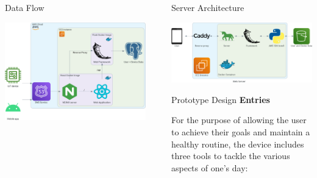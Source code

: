 \documentclass[final]{beamer}
\newlength{\sepwidth}
\newlength{\colwidth}
\newcommand{\separatorcolumn}{\begin{column}{\sepwidth}\end{column}}
\begin{document}
\begin{frame}[t]
\begin{columns}[t]
\begin{column}{\colwidth}
  \begin{block}{Data Flow}
    \vskip 0.5cm
    \begin{center}
      \includegraphics[width = 0.8 \linewidth]{data_flow.png}
    \end{center}
  \end{block}
\end{column}

\separatorcolumn

\begin{column}{\colwidth}
  \begin{block}{Server Architecture}
    \vskip 0.5cm
    \begin{center}
      \includegraphics[width = 0.8 \linewidth]{web_server.png}
    \end{center}
  \end{block}

    \begin{block}{Prototype Design}
    \textbf{Entries}

    For the purpose of allowing the user to achieve their goals and maintain a healthy routine, the device includes three tools to tackle the various aspects of one's day:


\end{block}
\end{column}
\end{columns}
\end{frame}
\end{document}
